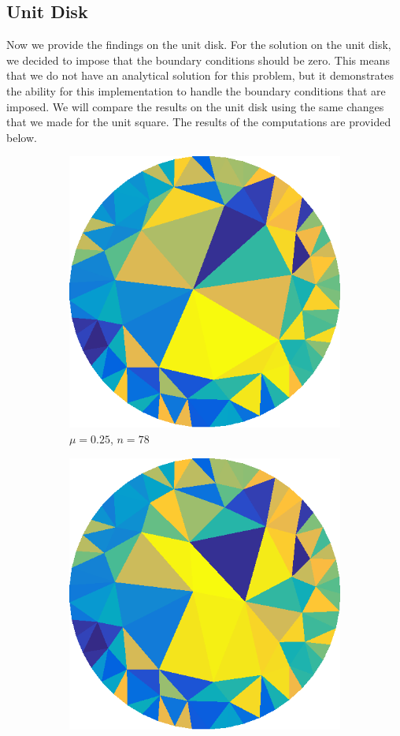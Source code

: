 \documentclass[../fem.tex]{subfile}
\begin{document}
\subsection{Unit Disk}%
\label{sub:unit_disk}

Now we provide the findings on the unit disk. For the solution on the unit
disk, we decided to impose that the boundary conditions should be zero. This
means that we do not have an analytical solution for this problem, but it
demonstrates the ability for this implementation to handle the boundary
conditions that are imposed. We will compare the results on the unit disk using
the same changes that we made for the unit square. The results of the
computations are provided below.

\begin{figure}[htpb]
  \centering
  \begin{subfigure}{0.4\textwidth}
    \centering
    \includegraphics[width=0.8\linewidth]{figures/c1/tri.png}
    \caption{$\mu=0.25$, $n=78$}
  \end{subfigure}
  \begin{subfigure}{0.4\textwidth}
    \centering
    \includegraphics[width=0.8\linewidth]{figures/c2/tri.png}

\end{subfigure}
\end{figure}
\end{document}
